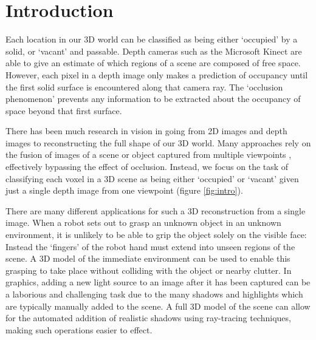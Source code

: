 \documentclass[10pt,twocolumn,letterpaper]{article}
\begin{document}
\section{Introduction}

Each location in our 3D world can be classified as being either `occupied' by a solid, or `vacant' and passable.
Depth cameras such as the Microsoft Kinect are able to give an estimate of which regions of a scene are composed of free space.
However, each pixel in a depth image only makes a prediction of occupancy until the first solid surface is encountered along that camera ray.
The `occlusion phenomenon' prevents any information to be extracted about the occupancy of space beyond that first surface.

There has been much research in vision in going from 2D images and depth images to reconstructing the full shape of our 3D world.
Many approaches rely on the fusion of images of a scene or object captured from multiple viewpoints \cite{izadi-uist-2011, vicente-cvpr-2014}, effectively bypassing the effect of occlusion.
Instead, we focus on the task of classifying each voxel in a 3D scene as being either `occupied' or `vacant' given just a single depth image from one viewpoint (figure \ref{fig:intro}).

There are many different applications for such a 3D reconstruction from a single image.
When a robot sets out to grasp an unknown object in an unknown environment, it is unlikely to be able to grip the object solely on the visible face: Instead the `fingers' of the robot hand must extend into unseen regions of the scene.
A 3D model of the immediate environment can be used to enable this grasping to take place without colliding with the object or nearby clutter.
In graphics, adding a new light source to an image after it has been captured can be a laborious and challenging task due to the many shadows and highlights which are typically manually added to the scene.
A full 3D model of the scene can allow for the automated addition of realistic shadows using ray-tracing techniques, making such operations easier to effect.
\end{document}
